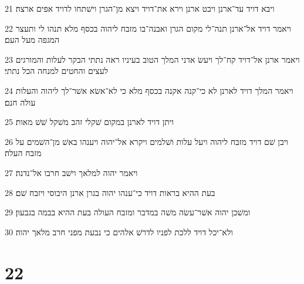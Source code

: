 \par 21 ויבא דויד עד־ארנן ויבט ארנן וירא את־דויד ויצא מן־הגרן וישׁתחו לדויד אפים ארצה׃
\par 22 ויאמר דויד אל־ארנן תנה־לי מקום הגרן ואבנה־בו מזבח ליהוה בכסף מלא תנהו לי ותעצר המגפה מעל העם׃
\par 23 ויאמר ארנן אל־דויד קח־לך ויעשׂ אדני המלך הטוב בעיניו ראה נתתי הבקר לעלות והמורגים לעצים והחטים למנחה הכל נתתי׃
\par 24 ויאמר המלך דויד לארנן לא כי־קנה אקנה בכסף מלא כי לא־אשׂא אשׁר־לך ליהוה והעלות עולה חנם׃
\par 25 ויתן דויד לארנן במקום שׁקלי זהב משׁקל שׁשׁ מאות׃
\par 26 ויבן שׁם דויד מזבח ליהוה ויעל עלות ושׁלמים ויקרא אל־יהוה ויענהו באשׁ מן־השׁמים על מזבח העלה׃
\par 27 ויאמר יהוה למלאך וישׁב חרבו אל־נדנה׃
\par 28 בעת ההיא בראות דויד כי־ענהו יהוה בגרן ארנן היבוסי ויזבח שׁם׃
\par 29 ומשׁכן יהוה אשׁר־עשׂה משׁה במדבר ומזבח העולה בעת ההיא בבמה בגבעון׃
\par 30 ולא־יכל דויד ללכת לפניו לדרשׁ אלהים כי נבעת מפני חרב מלאך יהוה׃

\chapter{22}

